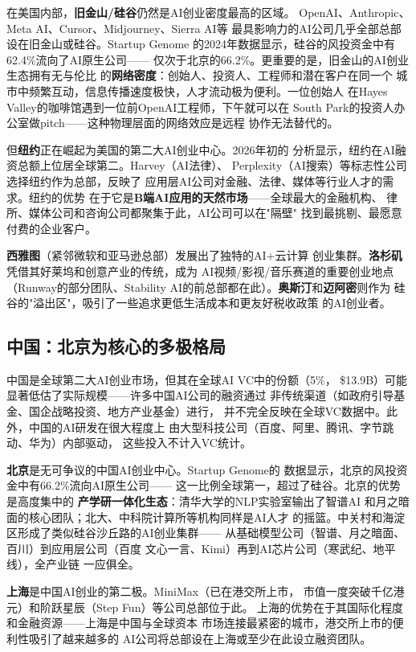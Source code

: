 在美国内部，\textbf{旧金山/硅谷}仍然是AI创业密度最高的区域。
OpenAI、Anthropic、Meta AI、Cursor、Midjourney、Sierra AI等
最具影响力的AI公司几乎全部总部设在旧金山或硅谷。Startup Genome
的2024年数据显示，硅谷的风投资金中有62.4\%流向了AI原生公司——
仅次于北京的66.2\%。更重要的是，旧金山的AI创业生态拥有无与伦比
的\textbf{网络密度}：创始人、投资人、工程师和潜在客户在同一个
城市中频繁互动，信息传播速度极快，人才流动极为便利。一位创始人
在Hayes Valley的咖啡馆遇到一位前OpenAI工程师，下午就可以在
South Park的投资人办公室做pitch——这种物理层面的网络效应是远程
协作无法替代的。

但\textbf{纽约}正在崛起为美国的第二大AI创业中心。2026年初的
分析显示，纽约在AI融资总额上位居全球第二。Harvey（AI法律）、
Perplexity（AI搜索）等标志性公司选择纽约作为总部，反映了
应用层AI公司对金融、法律、媒体等行业人才的需求。纽约的优势
在于它是\textbf{B端AI应用的天然市场}——全球最大的金融机构、
律所、媒体公司和咨询公司都聚集于此，AI公司可以在"隔壁"
找到最挑剔、最愿意付费的企业客户。

\textbf{西雅图}（紧邻微软和亚马逊总部）发展出了独特的AI+云计算
创业集群。\textbf{洛杉矶}凭借其好莱坞和创意产业的传统，成为
AI视频/影视/音乐赛道的重要创业地点（Runway的部分团队、Stability
AI的前总部都在此）。\textbf{奥斯汀}和\textbf{迈阿密}则作为
硅谷的"溢出区"，吸引了一些追求更低生活成本和更友好税收政策
的AI创业者。

\subsection{中国：北京为核心的多极格局}

中国是全球第二大AI创业市场，但其在全球AI VC中的份额（5\%，
\$13.9B）可能显著低估了实际规模——许多中国AI公司的融资通过
非传统渠道（如政府引导基金、国企战略投资、地方产业基金）进行，
并不完全反映在全球VC数据中。此外，中国的AI研发在很大程度上
由大型科技公司（百度、阿里、腾讯、字节跳动、华为）内部驱动，
这些投入不计入VC统计。

\textbf{北京}是无可争议的中国AI创业中心。Startup Genome的
数据显示，北京的风投资金中有66.2\%流向AI原生公司——
这一比例全球第一，超过了硅谷。北京的优势是高度集中的
\textbf{产学研一体化生态}：清华大学的NLP实验室输出了智谱AI
和月之暗面的核心团队；北大、中科院计算所等机构同样是AI人才
的摇篮。中关村和海淀区形成了类似硅谷沙丘路的AI创业集群——
从基础模型公司（智谱、月之暗面、百川）到应用层公司（百度
文心一言、Kimi）再到AI芯片公司（寒武纪、地平线），全产业链
一应俱全。

\textbf{上海}是中国AI创业的第二极。MiniMax（已在港交所上市，
市值一度突破千亿港元）和阶跃星辰（Step Fun）等公司总部位于此。
上海的优势在于其国际化程度和金融资源——上海是中国与全球资本
市场连接最紧密的城市，港交所上市的便利性吸引了越来越多的
AI公司将总部设在上海或至少在此设立融资团队。

